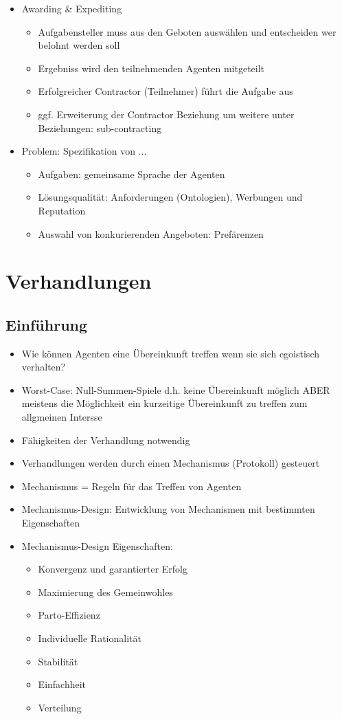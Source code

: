 \documentclass{article} %
\begin{document}
\begin{itemize}
		\item Awarding \& Expediting
		\begin{itemize}
			\item Aufgabensteller muss aus den Geboten auswählen und entscheiden wer belohnt werden soll
			\item Ergebniss wird den teilnehmenden Agenten mitgeteilt
			\item Erfolgreicher Contractor (Teilnehmer) führt die Aufgabe aus
			\item ggf. Erweiterung der Contractor Beziehung um weitere unter Beziehungen: sub-contracting
		\end{itemize}
		\item Problem: Spezifikation von ...
		\begin{itemize}
			\item Aufgaben: gemeinsame Sprache der Agenten
			\item Lösungsqualität: Anforderungen (Ontologien), Werbungen und Reputation
			\item Auswahl von konkurierenden Angeboten: Prefärenzen
		\end{itemize}
	\end{itemize}
	\section{Verhandlungen}
	\subsection{Einführung}
	\begin{itemize}
		\item Wie können Agenten eine Übereinkunft treffen wenn sie sich egoistisch verhalten?
		\item Worst-Case: Null-Summen-Spiele d.h. keine Übereinkunft möglich ABER meistens die Möglichkeit ein kurzeitige Übereinkunft zu treffen zum allgmeinen Intersse
		\item Fähigkeiten der Verhandlung notwendig
		\item Verhandlungen werden durch einen Mechanismus (Protokoll) gesteuert
		\item Mechanismus = Regeln für das Treffen von Agenten
		\item Mechanismus-Design: Entwicklung von Mechanismen mit bestimmten Eigenschaften
		\item Mechanismus-Design Eigenschaften:
		\begin{itemize}
			\item Konvergenz und garantierter Erfolg
			\item Maximierung des Gemeinwohles
			\item Parto-Effizienz
			\item Individuelle Rationalität
			\item Stabilität
			\item Einfachheit
			\item Verteilung
		\end{itemize} 
	\end{itemize}
\end{document}

